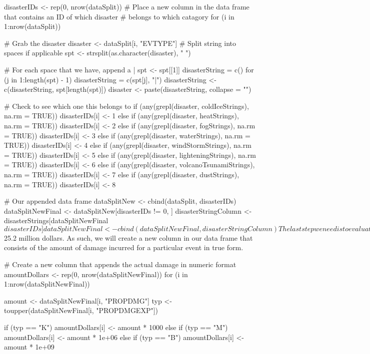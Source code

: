 disasterIDs <- rep(0, nrow(dataSplit))
# Place a new column in the data frame that contains an ID of which disaster
# belongs to which catagory
for (i in 1:nrow(dataSplit)) {
    # Grab the disaster
    disaster <- dataSplit[i, "EVTYPE"]
    # Split string into spaces if applicable
    spt <- strsplit(as.character(disaster), " ")

    # For each space that we have, append a |
    spt <- spt[[1]]
    disasterString = c()
    for (j in 1:length(spt) - 1) {
        disasterString = c(spt[j], "|")
    }
    disasterString <- c(disasterString, spt[length(spt)])
    disaster <- paste(disasterString, collapse = "")

    # Check to see which one this belongs to
    if (any(grepl(disaster, coldIceStrings), na.rm = TRUE)) {
        disasterIDs[i] <- 1
    } else if (any(grepl(disaster, heatStrings), na.rm = TRUE)) {
        disasterIDs[i] <- 2
    } else if (any(grepl(disaster, fogStrings), na.rm = TRUE)) {
        disasterIDs[i] <- 3
    } else if (any(grepl(disaster, waterStrings), na.rm = TRUE)) {
        disasterIDs[i] <- 4
    } else if (any(grepl(disaster, windStormStrings), na.rm = TRUE)) {
        disasterIDs[i] <- 5
    } else if (any(grepl(disaster, lighteningStrings), na.rm = TRUE)) {
        disasterIDs[i] <- 6
    } else if (any(grepl(disaster, volcanoTsunamiStrings), na.rm = TRUE)) {
        disasterIDs[i] <- 7
    } else if (any(grepl(disaster, dustStrings), na.rm = TRUE)) {
        disasterIDs[i] <- 8
    }
}
# Our appended data frame
dataSplitNew <- cbind(dataSplit, disasterIDs)
dataSplitNewFinal <- dataSplitNew[disasterIDs != 0, ]
disasterStringColumn <- disasterStrings[dataSplitNewFinal$disasterIDs]
dataSplitNewFinal <- cbind(dataSplitNewFinal, disasterStringColumn)
The last step we need is to evaluate economic damage performed for each kind of event. By examining the data, there are two columns of interest: PROPDMG and PROPDMGEXP. PROPDMG contains a base number, and PROPDMGEXP contains a single character that contains a multiplier of damage. This falls into one of three categories: K, M and B. K denotes thousands of dollars, M denotes millions of dollars and B denotes billions of dollars. As an example, supposing that a field of PROPDMG was 25.2, and PROPDMGEXP was M. This denotes that the total economic damage incurred for an event was $25.2 million dollars. As such, we will create a new column in our data frame that consists of the amount of damage incurred for a particular event in true form.

# Create a new column that appends the actual damage in numeric format
amountDollars <- rep(0, nrow(dataSplitNewFinal))
for (i in 1:nrow(dataSplitNewFinal)) {
    amount <- dataSplitNewFinal[i, "PROPDMG"]
    typ <- toupper(dataSplitNewFinal[i, "PROPDMGEXP"])

    if (typ == "K") {
        amountDollars[i] <- amount * 1000
    } else if (typ == "M") {
        amountDollars[i] <- amount * 1e+06
    } else if (typ == "B") {
        amountDollars[i] <- amount * 1e+09
    }
}

